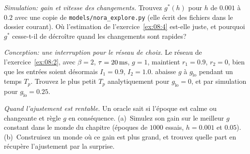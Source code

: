 \begin{exercise}[\lvlB]
\label{ex:08:5}
\emph{Simulation: gain et vitesse des changements.} Trouvez $g^*(h)$ pour $h$ de $0.001$ à $0.2$ avec une copie de \texttt{models/\allowbreak nora\_explore.py} (elle écrit des fichiers dans le dossier courant). Où l'estimation de l'exercice~\ref{ex:08:4} est-elle juste, et pourquoi $g^*$ cesse-t-il de décroître quand les changements sont rapides?
\end{exercise}

\begin{exercise}[\lvlB]
\label{ex:08:6}
\emph{Conception: une interruption pour le réseau de choix.} Le réseau de l'exercice~\ref{ex:08:2}, avec $\beta=2$, $\tau=20\,\text{ms}$, $g=1$, maintient $r_1=0.9$, $r_2=0$, bien que les entrées soient désormais $I_1=0.9$, $I_2=1.0$.  abaisse $g$ à $g_{\text{lo}}$ pendant un temps $T_p$. Trouvez le plus petit $T_p$ analytiquement pour $g_{\text{lo}}=0$, et par simulation pour $g_{\text{lo}}=0.25$.
\end{exercise}

\begin{exercise}[\lvlC]
\label{ex:08:7}
\emph{Quand l'ajustement est rentable.} Un oracle sait si l'époque est calme ou changeante et règle $g$ en conséquence. (a)~Simulez son gain sur le meilleur $g$ constant dans le monde du chapitre (époques de $1000$ essais, $h=0.001$ et $0.05$). (b)~Construisez un monde où ce gain est plus grand, et trouvez quelle part en récupère l'ajustement par la surprise.
\end{exercise}
